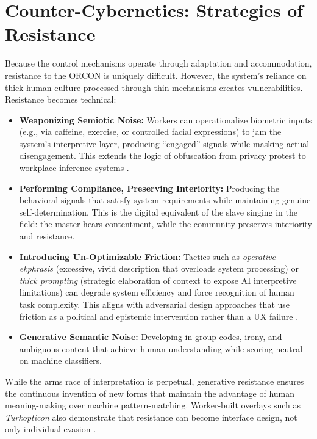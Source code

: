 \documentclass[11pt, a4paper]{article}
\begin{document}
\section{Counter-Cybernetics: Strategies of Resistance}

Because the control mechanisms operate through adaptation and accommodation, resistance to the ORCON is uniquely difficult. However, the system's reliance on thick human culture processed through thin mechanisms creates vulnerabilities. Resistance becomes technical:

\begin{itemize}
    \item \textbf{Weaponizing Semiotic Noise:} Workers can operationalize biometric inputs (e.g., via caffeine, exercise, or controlled facial expressions) to jam the system's interpretive layer, producing ``engaged'' signals while masking actual disengagement. This extends the logic of obfuscation from privacy protest to workplace inference systems \cite{nissenbaum2015obfuscation}.
    \item \textbf{Performing Compliance, Preserving Interiority:} Producing the behavioral signals that satisfy system requirements while maintaining genuine self-determination. This is the digital equivalent of the slave singing in the field: the master hears contentment, while the community preserves interiority and resistance.
    \item \textbf{Introducing Un-Optimizable Friction:} Tactics such as \textit{operative ekphrasis} (excessive, vivid description that overloads system processing) or \textit{thick prompting} (strategic elaboration of context to expose AI interpretive limitations) can degrade system efficiency and force recognition of human task complexity. This aligns with adversarial design approaches that use friction as a political and epistemic intervention rather than a UX failure \cite{disalvo2012adversarial}.
    \item \textbf{Generative Semantic Noise:} Developing in-group codes, irony, and ambiguous content that achieve human understanding while scoring neutral on machine classifiers.
\end{itemize}

While the arms race of interpretation is perpetual, generative resistance ensures the continuous invention of new forms that maintain the advantage of human meaning-making over machine pattern-matching. Worker-built overlays such as \textit{Turkopticon} also demonstrate that resistance can become interface design, not only individual evasion \cite{irani2013turkopticon}.
\end{document}
